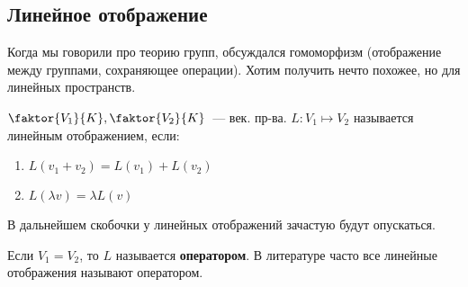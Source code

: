 \subsection{Линейное отображение}
\begin{motivation}
    Когда мы говорили про теорию групп, обсуждался гомоморфизм
    (отображение между группами, сохраняющее операции).
    Хотим получить нечто похожее, но для линейных пространств.
\end{motivation}
\begin{definition}
    $\faktor{V_1}{K},\faktor{V_2}{K}$~--- век. пр-ва. $L: V_1\mapsto V_2$ называется линейным отображением, если:
    \begin{enumerate}
        \item $L(v_1 + v_2) = L(v_1) + L(v_2)$
        \item $L(\lambda v) = \lambda L(v)$
    \end{enumerate}
\end{definition}
\begin{remark}
    В дальнейшем скобочки у линейных отображений зачастую будут опускаться.
\end{remark}
\begin{definition}
    Если $V_1=V_2$, то $L$ называется \textbf{оператором}.
    \remark В литературе часто все линейные отображения называют оператором.
\end{definition}
